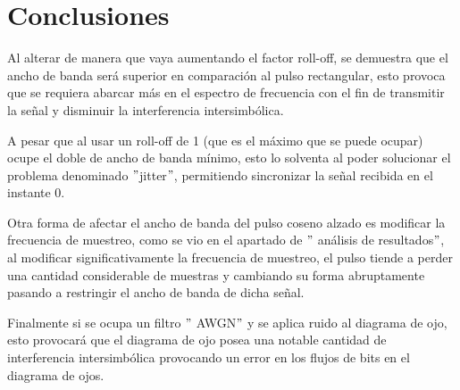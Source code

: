 \section{Conclusiones}\label{sec:conclusiones}

Al alterar de manera que vaya aumentando el factor roll-off, se demuestra que el ancho de banda será superior en comparación al pulso rectangular, esto provoca que se requiera abarcar más en el espectro de frecuencia con el fin de transmitir la señal y disminuir la interferencia intersimbólica.

A pesar que al usar un roll-off de 1 (que es el máximo que se puede ocupar)  ocupe el doble  de ancho de banda mínimo, esto lo solventa al poder solucionar el problema denominado $"$jitter$"$, permitiendo sincronizar la señal recibida en el instante 0.

Otra forma de afectar el ancho de banda del pulso coseno alzado es modificar la frecuencia de muestreo, como se vio en el apartado de $"$ análisis de resultados$"$, al modificar significativamente la frecuencia de muestreo, el pulso tiende a perder una cantidad considerable de muestras y cambiando su forma abruptamente pasando a restringir el ancho de banda de dicha señal.

Finalmente si se ocupa un filtro $"$ AWGN$"$ y se  aplica ruido al diagrama de ojo, esto provocará que el diagrama de ojo posea una notable cantidad de interferencia intersimbólica provocando un error en los flujos de bits en el diagrama de ojos.

